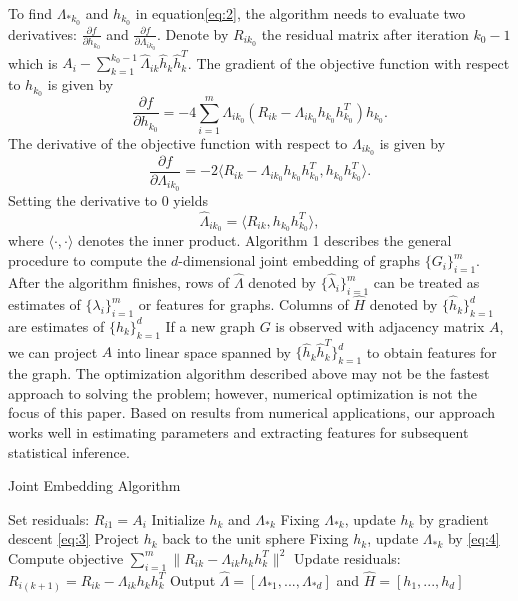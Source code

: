 \documentclass[10pt,journal,compsoc]{IEEEtran}
\begin{document}
\noindent To find $\Lambda_{*k_0}$ and $h_{k_0}$ in equation\ref{eq:2}, the algorithm needs to evaluate two derivatives: $\frac{\partial f}{\partial h_{k_0}}$ and $\frac{\partial f}{\partial \Lambda_{i k_0}}$. Denote by $R_{ik_0}$ the residual matrix after iteration $k_0-1$ which is $A_i- \sum\limits_{k=1}^{k_0-1}\hat{\Lambda}_{ik} \hat{h}_{k} \hat{h}_{k}^T$. The gradient of the objective function with respect to $h_{k_0}$ is given by
\begin{equation} \label{eq:3}
\frac{\partial f}{\partial h_{k_0}} = -4\sum\limits_{i=1}^{m}  \Lambda_{ik_0} (R_{ik}-\Lambda_{ik_0} h_{k_0} h_{k_0}^T)  h_{k_0}.
\end{equation}
The derivative of the objective function with respect to $\Lambda_{i k_0}$ is given by
\[\frac{\partial f}{\partial \Lambda_{i k_0}}= -2 \langle R_{ik}-\Lambda_{ik_0} h_{k_0} h_{k_0}^T,h_{k_0} h_{k_0}^T\rangle.\]
Setting the derivative to $0$ yields
\begin{equation}  \label{eq:4}
\hat{\Lambda}_{i k_0} = \langle R_{ik}, h_{k_0} h_{k_0}^T \rangle,
\end{equation}
where $\langle \cdot , \cdot \rangle$ denotes the inner product. Algorithm 1 describes the general procedure to compute the $d$-dimensional joint embedding of graphs $\{G_i\}_{i=1}^m$. After the algorithm finishes, rows of $\hat{\Lambda}$ denoted by $\{\hat{\lambda}_i\}_{i=1}^m$ can be treated as estimates of $\{\lambda_i\}_{i=1}^m$ or features for graphs. Columns of $\hat{H}$ denoted by $\{\hat{h}_k\}_{k=1}^d$ are estimates of $\{h_k\}_{k=1}^d$ If a new graph $G$ is observed with adjacency matrix $A$, we can project $A$ into linear space spanned by $\{\hat{h}_k \hat{h}_k^T\}_{k=1}^{d}$ to obtain features for the graph. The optimization algorithm described above may not be the fastest approach to solving the problem; however, numerical optimization is not the focus of this paper. Based on results from numerical applications, our approach works well in estimating parameters and extracting features for subsequent statistical inference.
\begin{algorithm}
	\caption{Joint Embedding Algorithm}
	\begin{algorithmic}[1]
		\State Set residuals: $R_{i1}=A_i$
		\State Initialize $h_k$ and $\Lambda_{*k}$ 
		\State Fixing $\Lambda_{*k}$, update $h_k$ by gradient descent \eqref{eq:3}
		\State Project $h_k$ back to the unit sphere
		\State Fixing $h_k$, update $\Lambda_{*k}$ by \eqref{eq:4}
		\State Compute objective $\sum\limits_{i=1}^{m} \| R_{ik}-  \Lambda_{ik} h_k h_k^T \|^2$
		\EndWhile
		\State Update residuals: $R_{i(k+1)}=R_{ik}- \Lambda_{ik} h_kh_k^T$
		\EndFor
		\State Output $\hat{\Lambda}=[\Lambda_{*1},...,\Lambda_{*d}]$ and $\hat{H}=[h_1,...,h_d]$
		\EndProcedure
	\end{algorithmic}
\end{algorithm}
\end{document}
